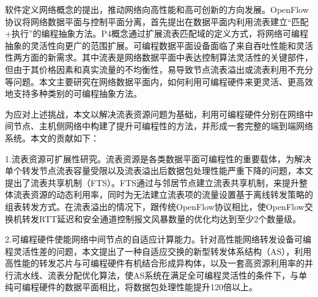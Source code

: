 
\setcounter{page}{1}

%
%
%


软件定义网络概念的提出，推动网络向高性能和高可创新的方向发展。OpenFlow协议将网络数据平面与控制平面分离，首先提出在数据平面内利用流表建立“匹配+执行”的编程抽象方法。P4概念通过扩展流表匹配域的定义方式，将网络可编程抽象的灵活性向更广的范围扩展。可编程数据平面设备面临了来自吞吐性能和灵活性两方面的新需求。其中流表是网络数据平面中表达控制算法灵活性的关键部件，但由于其价格因素和真实流量的不均衡性，易导致节点流表溢出或流表利用不充分等问题。本文主要研究在网络数据平面内，如何利用可编程硬件来更灵活、更高效地支持多种类别的可编程抽象方法。


为应对上述挑战，本文以解决流表资源问题为基础，利用可编程硬件分别在网络中间节点、主机侧网络中构建了提升可编程性的方法，并形成一套完整的端到端网络系统。本文的贡献如下：

1.流表资源可扩展性研究。流表资源是各类数据平面可编程性的重要载体，为解决单个转发节点流表容量受限以及流表溢出后数据包处理性能严重下降的问题，本文提出了流表共享机制（FTS）。FTS通过与邻居节点建立流表共享机制，来提升整体流表资源的动态利用率，同时为无法建立流表项的流量设置基于离线转发策略的组表转发方式。在流表溢出的情况下，跟传统OpenFlow协议相比，使OpenFlow交换机转发RTT延迟和安全通道控制报文风暴数量的优化均达到至少2个数量级。

2.可编程硬件使能网络中间节点的自适应计算能力。针对高性能网络转发设备可编程灵活性差的问题，本文提出了一种自适应交换的新型转发体系结构（AS），利用高性能的转发芯片与可编程硬件有机结合形成异构体，以及一套高资源利用率的并行流水线、流表分配优化算法，使AS系统在满足全可编程灵活性的条件下，与单纯可编程硬件的数据平面相比，将数据包处理性能提升120倍以上。


